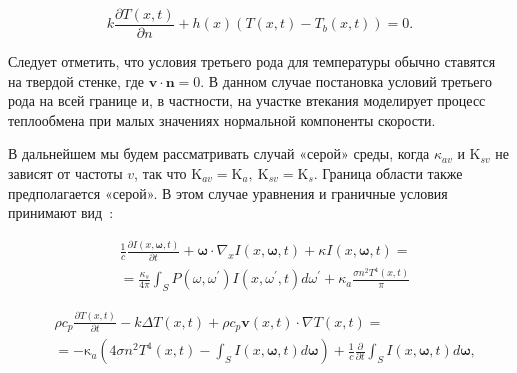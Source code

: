 \[
    k \frac{\partial T(x, t)}{\partial n}+h(x)\left(T(x, t)-T_{b}(x, t)\right)=0.
\]

Следует отметить, что условия третьего рода для температуры
обычно ставятся на твердой стенке,
где $\mathbf{v} \cdot \mathbf{n} = 0$.
В данном случае постановка условий третьего рода на всей границе и, в частности,
на участке втекания моделирует процесс теплообмена при
малых значениях нормальной компоненты скорости.

В дальнейшем мы будем рассматривать случай «серой» среды,
когда $\kappa_{a v}$ и $\mathrm{K}_{s v}$ не зависят от частоты $v$,
так что $\mathrm{K}_{a v}=\mathrm{K}_{a}, \mathrm{~K}_{s v}=\mathrm{K}_{s}$.
Граница области также предполагается «серой».
В этом случае уравнения и граничные условия принимают вид~\cite{Kovtanyuk2014a}:

\begin{equation}
    \label{eq:1_1:3}
    \begin{aligned}
        & \frac{1}{c} \frac{\partial I(x, \boldsymbol{\omega}, t)}{\partial t}
        +\boldsymbol{\omega} \cdot \nabla_{x} I(x, \boldsymbol{\omega}, t)
        +\kappa I(x, \boldsymbol{\omega}, t)= \\
        & =\frac{\kappa_{s}}{4 \pi} \int_{S} P
        \left(\omega, \omega^{\prime}\right) I
        \left(x, \omega^{\prime}, t\right) d \omega^{\prime}
        +\kappa_{a} \frac{\sigma n^{2} T^{4}(x, t)}{\pi}
    \end{aligned}
\end{equation}

\begin{equation}
    \label{eq:1_1:4}
    \begin{aligned}
        & \rho c_{p} \frac{\partial T(x, t)}{\partial t}
        -k \Delta T(x, t)+\rho c_{p} \mathbf{v}(x, t) \cdot \nabla T(x, t)= \\
        & =-\mathrm{\kappa}_{a}\left(4 \sigma n^{2} T^{4}(x, t)-
        \int_{S} I(x, \boldsymbol{\omega}, t) d \boldsymbol{\omega}\right)
        +\frac{1}{c} \frac{\partial}{\partial t}
        \int_{S} I(x, \boldsymbol{\omega}, t) d \boldsymbol{\omega},
    \end{aligned}
\end{equation}

